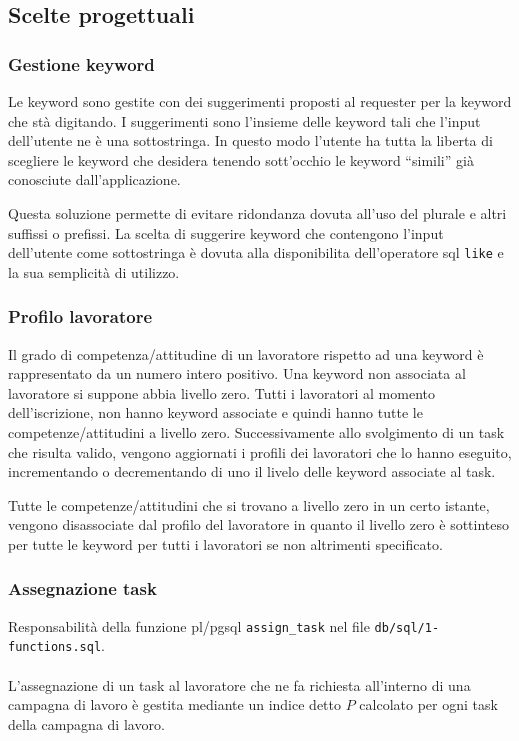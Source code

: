 \documentclass[a4paper]{article}
\begin{document}
\subsection{Scelte progettuali}
\subsubsection{Gestione keyword}
Le keyword sono gestite con dei suggerimenti proposti al requester per la keyword che st\`a digitando.
I suggerimenti sono l'insieme delle keyword tali che l'input dell'utente ne \`e una sottostringa.
In questo modo l'utente ha tutta la liberta di scegliere le keyword che desidera tenendo sott'occhio le keyword ``simili'' gi\`a conosciute dall'applicazione.

Questa soluzione permette di evitare ridondanza dovuta all'uso del plurale e altri suffissi o prefissi.
La scelta di suggerire keyword che contengono l'input dell'utente come sottostringa \`e dovuta alla disponibilita dell'operatore sql \verb|like| e la sua semplicit\`a di utilizzo.

\subsubsection{Profilo lavoratore}
Il grado di competenza/attitudine di un lavoratore rispetto ad una keyword \`e rappresentato da un numero intero positivo.
Una keyword non associata al lavoratore si suppone abbia livello zero.
Tutti i lavoratori al momento dell'iscrizione, non hanno keyword associate e quindi hanno tutte le competenze/attitudini a livello zero.
Successivamente allo svolgimento di un task che risulta valido, vengono aggiornati i profili dei lavoratori che lo hanno eseguito, incrementando o decrementando di uno il livelo delle keyword associate al task.

Tutte le competenze/attitudini che si trovano a livello zero in un certo istante, vengono disassociate dal profilo del lavoratore in quanto il livello zero \`e sottinteso per tutte le keyword per tutti i lavoratori se non altrimenti specificato.

\subsubsection{Assegnazione task}
Responsabilit\`a della funzione pl/pgsql \verb|assign_task| nel file \verb|db/sql/1-functions.sql|.
\\\\
L'assegnazione di un task al lavoratore che ne fa richiesta all'interno di una campagna di lavoro \`e gestita mediante un indice detto $P$ calcolato per ogni task della  campagna di lavoro.
\end{document}
